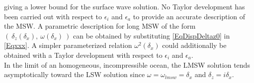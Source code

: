 \documentclass[a4paper,11pt]{article}
\begin{document}
giving a lower bound for the surface wave solution. No Taylor development has been carried out with respect to $\epsilon_i$ and $\epsilon_a$ to provide an accurate description of the MSW. A parametric description for long MSW of the form $(\ \delta_z(\delta_x),\ \omega(\delta_x)\ )$ can be obtained by substituting \ref{EqDispDeltaz0} in \ref{Eqxxx}. A simpler parameterized relation $\omega^2(\delta_x)$ could additionally be obtained with a Taylor development with respect to $\epsilon_i$ and $\epsilon_a$.\\
In the limit of an homogeneous, incompressible ocean, the LMSW solution tends asymptotically toward the LSW solution since $\omega=\omega_{lmsw}=\delta_x$ and $\delta_z=i\delta_x$.\\

\end{document}
